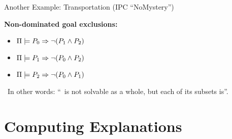 \begin{frame}{Another Example: Transportation (IPC ``NoMystery'')}
\bigskip \pause

\textbf{Non-dominated goal exclusions:} 

\pause

\begin{itemize}
\item $\Pi \models P_0 \Rightarrow \neg (P_1 \wedge P_2)$
\item $\Pi \models P_1 \Rightarrow \neg (P_0 \wedge P_2)$
\item $\Pi \models P_2 \Rightarrow \neg (P_0 \wedge P_1)$
\end{itemize}

\pause

\notesym~In other words: ``\goalsoft\ is not solvable 
as a whole, but each of its subsets is''.

\medskip

\end{frame}



%

\section[Computing]{Computing Explanations}
\subsection*{}

